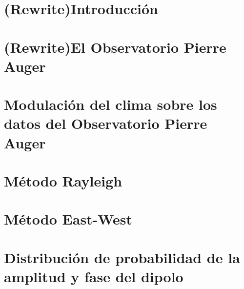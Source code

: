 \documentclass[12pt,papel,twoside,pagebackref]{ibtesis}
\begin{document}
\begin{preliminary}
	\tableofcontents                %
	\listoffigures                  %


\end{preliminary}

 \chapter{(Rewrite)Introducción}
	\graphicspath{{../01_Introduccion/}}
	
  
 \chapter{(Rewrite)El Observatorio Pierre Auger}
	\graphicspath{{../02_IntroduccionAuger/}}
	

	\graphicspath{{../03_IntroduccionReport/}}
	

\chapter{Modulación del clima sobre los datos del Observatorio Pierre Auger}

	\graphicspath{{../04_Clima/}}
	
	
	
	
	

	
\chapter{Método Rayleigh}
	\graphicspath{{../05_MetodoRayleigh/}}
	

\chapter{Método East-West}
	\graphicspath{{../EW/}}
	
	
\chapter{Distribución de probabilidad de la amplitud y fase del dipolo} \label{PDFs}
	\graphicspath{{../EW/}}
	
\end{document}

